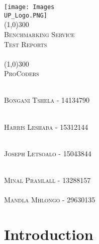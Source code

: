 \documentclass[runningheads,a4paper]{article}
\begin{document}
	
\begin{titlepage}
	\begin{center}
		\texttt{[image: Images\\UP\_Logo.PNG]}  \\
		[1cm]
		\line(1,0){300} \\
		[0.3cm]
		\textsc{\Large
			Benchmarking Service\\
			Test Reports\\
			\hfill
		}\\
		[0.1cm]
		\line(1,0){300} \\
		[0.7cm]
		\textsc{\Large
			ProCoders
		} \\
	\end{center}
	
	\begin{center}
		\begin{centre}
			\textsc{\large\\
				Bongani Tshela - 14134790\\ 
			}
		
			\textsc{\large\\
				Harris Leshaba - 15312144\\ 
			}

			\textsc{\large\\
				Joseph Letsoalo - 15043844\\ 
			}
			
			\textsc{\large\\
				Minal Pramlall - 13288157\\ 
			}
			\textsc{\large\\
				Mandla Mhlongo - 29630135\\ 
			}
		

            

		\end{centre}
		
		
		
	\end{center}
\end{titlepage}

\begingroup

\tableofcontents
{}
\endgroup
\newpage

\section{Introduction}
\end{document}
